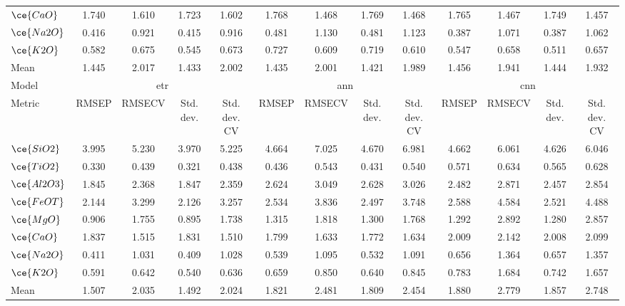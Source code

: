 \begin{table*}[]
{\begin{tabular}{l|cccc|cccc|cccc}
$\ce{CaO}$ & 1.740 & 1.610 & 1.723 & 1.602 & 1.768 & 1.468 & 1.769 & 1.468 & 1.765 & 1.467 & 1.749 & 1.457 \\
$\ce{Na2O}$ & 0.416 & 0.921 & 0.415 & 0.916 & 0.481 & 1.130 & 0.481 & 1.123 & 0.387 & 1.071 & 0.387 & 1.062 \\
$\ce{K2O}$ & 0.582 & 0.675 & 0.545 & 0.673 & 0.727 & 0.609 & 0.719 & 0.610 & 0.547 & 0.658 & 0.511 & 0.657 \\
\hline
Mean & 1.445 & 2.017 & 1.433 & 2.002 & 1.435 & 2.001 & 1.421 & 1.989 & 1.456 & 1.941 & 1.444 & 1.932 \\
\hline
Model & \multicolumn{4}{c}{\gls{etr}} & \multicolumn{4}{c}{\gls{ann}} & \multicolumn{4}{c}{\gls{cnn}} \\
Metric & \multicolumn{1}{c}{RMSEP} & \multicolumn{1}{c}{RMSECV} & \multicolumn{1}{c}{Std. dev.} & \multicolumn{1}{c}{Std. dev. CV} & \multicolumn{1}{c}{RMSEP} & \multicolumn{1}{c}{RMSECV} & \multicolumn{1}{c}{Std. dev.} & \multicolumn{1}{c}{Std. dev. CV} & \multicolumn{1}{c}{RMSEP} & \multicolumn{1}{c}{RMSECV} & \multicolumn{1}{c}{Std. dev.} & \multicolumn{1}{c}{Std. dev. CV} \\
\hline
$\ce{SiO2}$ & 3.995 & 5.230 & 3.970 & 5.225 & 4.664 & 7.025 & 4.670 & 6.981 & 4.662 & 6.061 & 4.626 & 6.046 \\
$\ce{TiO2}$ & 0.330 & 0.439 & 0.321 & 0.438 & 0.436 & 0.543 & 0.431 & 0.540 & 0.571 & 0.634 & 0.565 & 0.628 \\
$\ce{Al2O3}$ & 1.845 & 2.368 & 1.847 & 2.359 & 2.624 & 3.049 & 2.628 & 3.026 & 2.482 & 2.871 & 2.457 & 2.854 \\
$\ce{FeOT}$ & 2.144 & 3.299 & 2.126 & 3.257 & 2.534 & 3.836 & 2.497 & 3.748 & 2.588 & 4.584 & 2.521 & 4.488 \\
$\ce{MgO}$ & 0.906 & 1.755 & 0.895 & 1.738 & 1.315 & 1.818 & 1.300 & 1.768 & 1.292 & 2.892 & 1.280 & 2.857 \\
$\ce{CaO}$ & 1.837 & 1.515 & 1.831 & 1.510 & 1.799 & 1.633 & 1.772 & 1.634 & 2.009 & 2.142 & 2.008 & 2.099 \\
$\ce{Na2O}$ & 0.411 & 1.031 & 0.409 & 1.028 & 0.539 & 1.095 & 0.532 & 1.091 & 0.656 & 1.364 & 0.657 & 1.357 \\
$\ce{K2O}$ & 0.591 & 0.642 & 0.540 & 0.636 & 0.659 & 0.850 & 0.640 & 0.845 & 0.783 & 1.684 & 0.742 & 1.657 \\
\hline
Mean & 1.507 & 2.035 & 1.492 & 2.024 & 1.821 & 2.481 & 1.809 & 2.454 & 1.880 & 2.779 & 1.857 & 2.748 \\
\hline
\end{tabular}%
}
\label{tab:init_results}
\end{table*}
